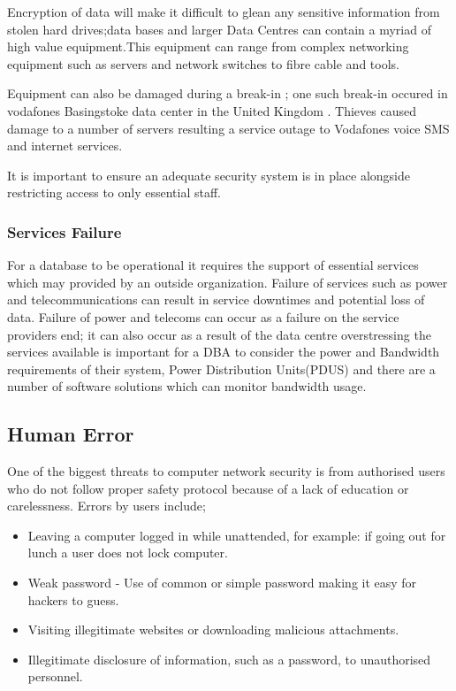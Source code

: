 \documentclass[11pt, twocolumn]{article}
\begin{document}
Encryption of data will make it  difficult to glean any sensitive information from stolen hard drives;data bases and larger Data Centres can contain a myriad of high value equipment.This equipment can range from complex networking equipment such as servers and network switches to fibre cable and tools.

Equipment can also be damaged during a break-in ; one such break-in occured in vodafones Basingstoke data center in the United Kingdom \cite{sean8}.  Thieves caused damage to a number of servers resulting a service outage to Vodafones voice SMS and internet services.

It is important to ensure an adequate security system is in place alongside restricting access to only essential staff.


\subsubsection{Services Failure}
For a database to be operational it requires the support of essential services which may provided by an outside organization.  Failure of services such as power and telecommunications can result in service downtimes and potential loss of data.  Failure of power and telecoms can occur as a failure on the service providers end; it can also occur as a result of the data centre overstressing the services available is important for a DBA to consider the power and Bandwidth requirements of their system, Power Distribution Units(PDUS) and there are a number of software solutions which can monitor bandwidth usage.


\subsection{Human Error}
One of the biggest threats to computer network security is from authorised users who do not follow proper safety protocol because of a lack of education or carelessness.  Errors by users include;

\begin{itemize}
\item Leaving a computer logged in while unattended, for example: if going out for lunch a user does not lock computer.
\item Weak password - Use of common or simple password making it easy for hackers to guess.
\item Visiting illegitimate websites or downloading malicious attachments.
\item Illegitimate disclosure of information, such as a password, to unauthorised personnel.
\end{itemize}
\end{document}
